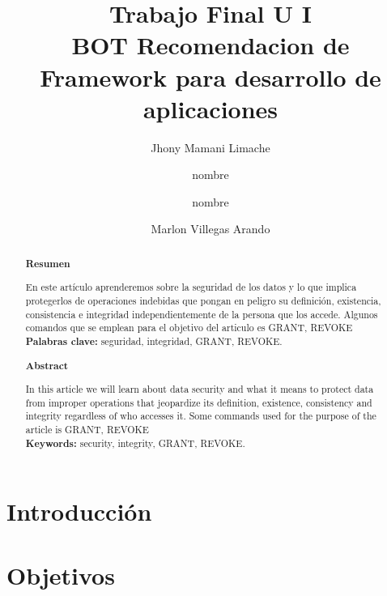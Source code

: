 \documentclass[%
 reprint,
 amsmath,amssymb,
 aps,
]{revtex4-1}
\begin{document}
\title{Trabajo Final U I  \\ BOT Recomendacion de Framework para desarrollo de aplicaciones }
\author{Jhony Mamani Limache}
\author{nombre}
\author{nombre}
\author{Marlon Villegas Arando}
%

\begin{abstract}
\begin{center}
\textbf{Resumen}
\end{center}

En este artículo aprenderemos sobre la seguridad de los datos y lo que implica protegerlos de operaciones indebidas que pongan en peligro su definición, existencia, consistencia e integridad independientemente de la persona que los accede. Algunos comandos que se emplean para el objetivo del articulo es GRANT, REVOKE\\

\textbf{Palabras clave:}   seguridad, integridad, GRANT, REVOKE.\\

\begin{center}
\textbf{Abstract}
\end{center}
In this article we will learn about data security and what it means to protect data from improper operations that jeopardize its definition, existence, consistency and integrity regardless of who accesses it. Some commands used for the purpose of the article is GRANT, REVOKE\\
\textbf{Keywords:}   security, integrity, GRANT, REVOKE.\\

\end{abstract}



\maketitle


\section {Introducción}\label{sec:1}





\section{Objetivos}\label{sec:2}
\end{document}

